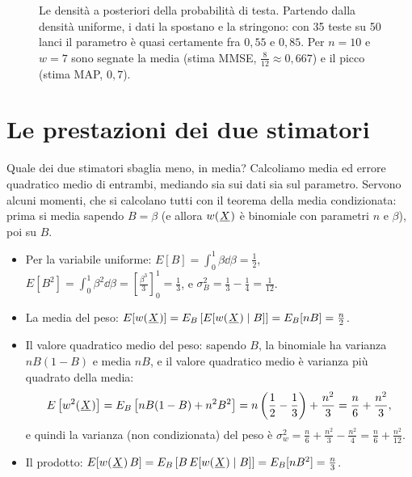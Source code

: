 \begin{figure}[H]
\caption{Le densità a posteriori della probabilità di testa. Partendo dalla densità uniforme, i dati la spostano e la
stringono: con 35 teste su 50 lanci il parametro è quasi certamente fra $0{,}55$ e $0{,}85$. Per $n = 10$ e $w = 7$ sono
segnate la media (stima MMSE, $\frac{8}{12} \approx 0{,}667$) e il picco (stima MAP, $0{,}7$).}
\end{figure}

\section{Le prestazioni dei due stimatori}

Quale dei due stimatori sbaglia meno, in media? Calcoliamo media ed errore quadratico medio di entrambi, mediando sia
sui dati sia sul parametro. Servono alcuni momenti, che si calcolano tutti con il teorema della media condizionata:
prima si media sapendo $B = \beta$ (e allora $w({\mkern1mu\underline{X}\mkern1mu})$ è binomiale con parametri $n$ e $\beta$), poi su $B$.
\begin{itemize}
  \item Per la variabile uniforme: $E[B] = \int_0^1 \beta \dd\beta = \frac12$, $E[B^2] = \int_0^1 \beta^2 \dd\beta =
        \left[ \frac{\beta^3}{3} \right]_0^1 = \frac13$, e $\sigma_B^2 = \frac13 - \frac14 = \frac{1}{12}$.
  \item La media del peso: $E[w({\mkern1mu\underline{X}\mkern1mu})] = E_B\left[ E[w({\mkern1mu\underline{X}\mkern1mu}) \mid B] \right] = E_B[nB] = \frac{n}{2}$.
  \item Il valore quadratico medio del peso: sapendo $B$, la binomiale ha varianza $nB(1 - B)$ e media $nB$, e il valore
        quadratico medio è varianza più quadrato della media:
        \[ E\left[ w^2({\mkern1mu\underline{X}\mkern1mu}) \right] = E_B\left[ nB(1 - B) + n^2 B^2 \right] = n \left( \frac12 - \frac13 \right) +
           \frac{n^2}{3} = \frac{n}{6} + \frac{n^2}{3} , \]
        e quindi la varianza (non condizionata) del peso è $\sigma_{w}^2 = \frac{n}{6} + \frac{n^2}{3} - \frac{n^2}{4} =
        \frac{n}{6} + \frac{n^2}{12}$.
  \item Il prodotto: $E[w({\mkern1mu\underline{X}\mkern1mu})\, B] = E_B\left[ B\, E[w({\mkern1mu\underline{X}\mkern1mu}) \mid B] \right] = E_B[n B^2] = \frac{n}{3}$.
\end{itemize}

